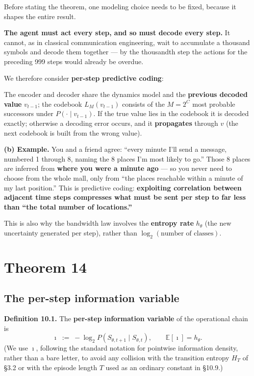 \documentclass[11pt]{article}
\renewenvironment{quote}
  {\def\FrameCommand{{\color{gray!60}\vrule width 2pt}\hspace{8pt}}%
   \MakeFramed{\advance\hsize-\width \FrameRestore}\begin{itshape}}
  {\end{itshape}\endMakeFramed}
\begin{document}
Before stating the theorem, one modeling choice needs to be fixed, because it shapes the entire result.

\textbf{The agent must act every step, and so must decode every step.} It cannot, as in classical communication engineering, wait to accumulate a thousand symbols and decode them together --- by the thousandth step the actions for the preceding 999 steps would already be overdue.

We therefore consider \textbf{per-step predictive coding}:

\begin{quote}
The encoder and decoder share the dynamics model and the \textbf{previous decoded value} \(v_{t-1}\); the codebook \(L_M(v_{t-1})\) consists of the \(M=2^C\) most probable successors under \(P(\cdot\mid v_{t-1})\). If the true value lies in the codebook it is decoded exactly; otherwise a decoding error occurs, and it \textbf{propagates} through \(v\) (the next codebook is built from the wrong value).
\end{quote}

\textbf{(b) Example.} You and a friend agree: ``every minute I'll send a message, numbered 1 through 8, naming the 8 places I'm most likely to go.'' Those 8 places are inferred from \textbf{where you were a minute ago} --- so you never need to choose from the whole mall, only from ``the places reachable within a minute of my last position.'' This is predictive coding: \textbf{exploiting correlation between adjacent time steps compresses what must be sent per step to far less than ``the total number of locations.''}

This is also why the bandwidth law involves the \textbf{entropy rate} \(h_\theta\) (the new uncertainty generated per step), rather than \(\log_2(\text{number of classes})\).

\hypertarget{theorem-14}{%
\section{Theorem 14}\label{theorem-14}}

\hypertarget{the-per-step-information-variable}{%
\subsection{The per-step information variable}\label{the-per-step-information-variable}}

\begin{quote}
\textbf{Definition 10.1.} The \textbf{per-step information variable} of the operational chain is
\[\imath\;:=\;-\log_2 P(S_{\theta,t+1}\mid S_{\theta,t}),\qquad \mathbb E[\imath]=h_\theta.\]
(We use \(\imath\), following the standard notation for pointwise information density, rather than a bare letter, to avoid any collision with the transition entropy \(H_T\) of \S{}3.2 or with the episode length \(T\) used as an ordinary constant in \S{}10.9.)
\end{quote}
\end{document}
